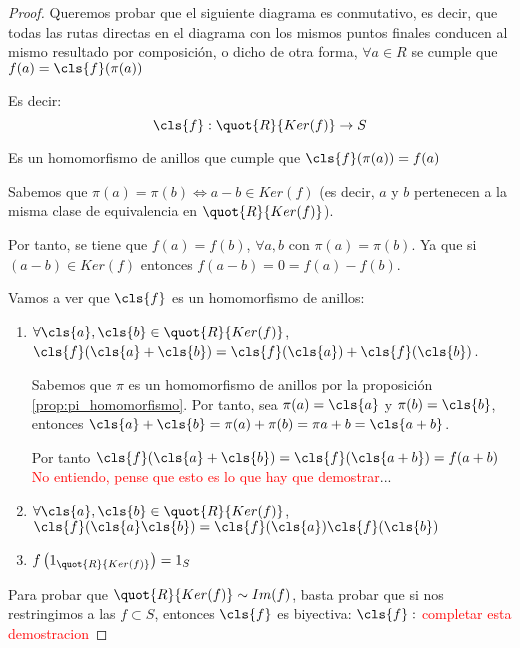 \begin{proof}
Queremos probar que el siguiente diagrama es conmutativo, es decir, que todas las rutas directas en el diagrama con los mismos puntos finales conducen al mismo resultado por composición, o dicho de otra forma, $\forall a \in R$ se cumple que $f(a)=\cls{f}(\pi(a))$

Es decir:
$$ \cls{f}: \quot{R}{Ker(f)} \rightarrow S$$

Es un homomorfismo de anillos que cumple que $\cls{f}(\pi(a))=f(a)$

Sabemos que $\pi(a)=\pi(b) \Leftrightarrow a-b \in Ker(f)$ (es decir, $a$ y $b$ pertenecen a la misma clase de equivalencia en $ \quot{R}{Ker(f)}$).

Por tanto, se tiene que $f(a)=f(b)$, $\forall a,b$ con $\pi(a)=\pi(b)$. Ya que si $(a-b) \in Ker(f)$ entonces $f(a-b)=0=f(a)-f(b)$.

Vamos a ver que $\cls{f}$ es un homomorfismo de anillos:
\begin{enumerate}
	\item $\forall \cls{a},\cls{b} \in \quot{R}{Ker(f)}$, $\cls{f}(\cls{a}+\cls{b})=\cls{f}(\cls{a})+\cls{f}(\cls{b})$.

	Sabemos que $\pi$ es un homomorfismo de anillos por la proposición \ref{prop:pi_homomorfismo}. Por tanto, sea $\pi(a)=\cls{a}$ y $\pi(b)=\cls{b}$, entonces $\cls{a}+\cls{b}=\pi(a)+\pi(b)=\pi{a+b}=\cls{a+b}$.

	Por tanto $\cls{f}(\cls{a}+\cls{b})=\cls{f}(\cls{a+b}) = f(a+b)$ \textcolor{red}{No entiendo, pense que esto es lo que hay que demostrar}...
	\item $\forall \cls{a},\cls{b} \in \quot{R}{Ker(f)}$, $\cls{f}(\cls{a}\cls{b})=\cls{f}(\cls{a})\cls{f}(\cls{b})$
	\item $f\left(1_{\quot{R}{Ker(f)}}\right)=1_{S}$
\end{enumerate}

Para probar que $\quot{R}{Ker(f)} \sim Im(f)$, basta probar que si nos restringimos a las $f \subset S$, entonces $\cls{f}$ es biyectiva: $\cls{f}:$ \textcolor{red}{completar esta demostracion}
\end{proof}

